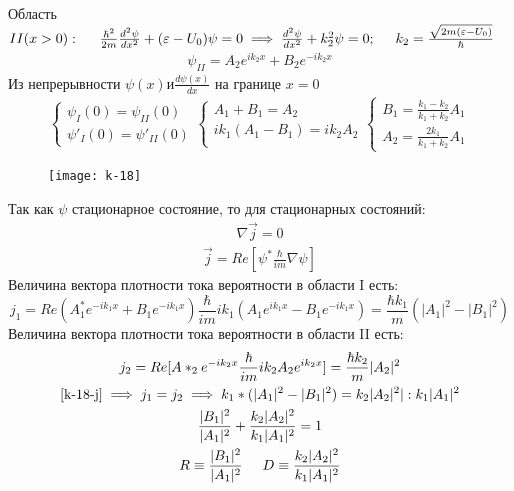 \documentclass[__main__.tex]{subfiles}
\begin{document}
Область $II(x > 0): \hspace{0.5cm} \frac{\hbar^2}{2m}\frac{d^2\psi}{dx^2} + (\varepsilon - U_0)\psi = 0 \implies \frac{d^2\psi}{dx^2}+k_2^2\psi=0; \hspace{0.5cm} k_2=\frac{\sqrt{2m(\varepsilon - U_0)}}{\hbar}$
\begin{gather*}
\psi_{II} = A_2e^{ik_2x}+B_2e^{-ik_2x}
\end{gather*}
Из непрерывности $\psi(x) и \frac{d\psi(x)}{dx}$ на границе $x=0$ 
\begin{gather}
\begin{cases}
\psi_I(0) = \psi_{II}(0)\\
\psi'_I(0) = \psi'_{II}(0)
\end{cases}
\begin{cases}
A_1 + B_1 = A_2\\
ik_1(A_1 - B_1) = ik_2A_2\\
\end{cases}
\begin{cases}
\label{k-18-b1}
B_1 = \frac{k_1 - k_2}{k_1 + k_2}A_1\\
A_2 = \frac{2k_1}{k_1 + k_2}A_1
\end{cases}
\end{gather}
\begin{wrapfigure}{L}{.3\linewidth}
	\texttt{[image: k-18]}
	\caption{}
	\label{k-18}
\end{wrapfigure}
Так как $\psi$ стационарное состояние, то
для стационарных состояний:
\begin{gather}
\nabla\vec{j} = 0
\label{k-18-j}
\end{gather}
\begin{gather*}
\vec{j} = Re[\psi^*\frac{\hbar}{im}\nabla\psi]
\end{gather*}
Величина вектора плотности тока вероятности в области I есть:
$$
j_1 = Re(A_1^*e^{-ik_1x} + B_1e^{-ik_1x})\frac{\hbar}{im}ik_1(A_1e^{ik_1x} - B_1e^{-ik_1x}) =\frac{\hbar k_1}{m}(|A_1|^2 - |B_1|^2)
$$
Величина вектора плотности тока вероятности в области II есть:
\begin{gather*}
j_2 = Re[A*_2e^{-ik_2x}\frac{\hbar}{im}ik_2A_2e^{ik_2x}] = \frac{\hbar k_2}{m}|A_2|^2\\
\ref{k-18-j} \implies j_1 = j_2 \implies k_1*(|A_1|^2 - |B_1|^2) = k_2|A_2|^2 | : k_1|A_1|^2\\
\frac{|B_1|^2}{|A_1|^2} + \frac{k_2|A_2|^2}{k_1|A_1|^2} = 1\\
R \equiv \frac{|B_1|^2}{|A_1|^2} \hspace{0.5cm} D \equiv \frac{k_2|A_2|^2}{k_1|A_1|^2}\\
\end{gather*}
\end{document}
